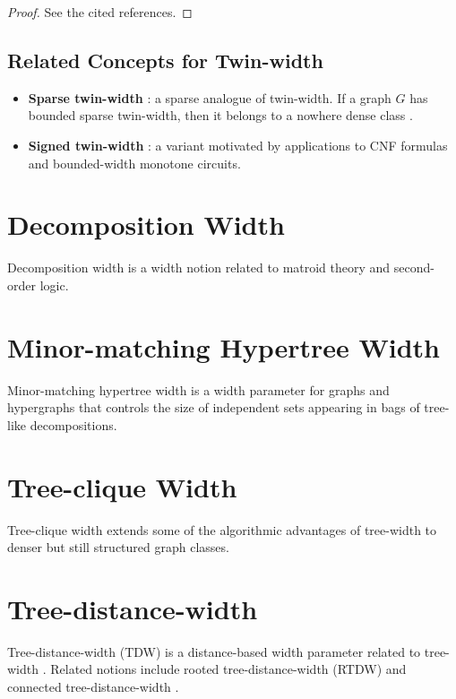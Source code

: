 \documentclass[10pt]{book}
\theoremstyle{definition}
\begin{document}
\begin{proof}
See the cited references.
\end{proof}

\subsection{Related Concepts for Twin-width}

\begin{itemize}
    \item \textbf{Sparse twin-width} \cite{171,252}: a sparse analogue of twin-width.  
    If a graph \(G\) has bounded sparse twin-width, then it belongs to a nowhere dense class \cite{314}.

    \item \textbf{Signed twin-width} \cite{203}: a variant motivated by applications to CNF formulas and bounded-width monotone circuits.
\end{itemize}

\section{Decomposition Width}

Decomposition width \cite{54} is a width notion related to matroid theory and second-order logic.

\section{Minor-matching Hypertree Width}

Minor-matching hypertree width \cite{55} is a width parameter for graphs and hypergraphs that controls the size of independent sets appearing in bags of tree-like decompositions.

\section{Tree-clique Width}

Tree-clique width \cite{56} extends some of the algorithmic advantages of tree-width to denser but still structured graph classes.

\section{Tree-distance-width}

Tree-distance-width (TDW) is a distance-based width parameter related to tree-width \cite{57}.  
Related notions include rooted tree-distance-width (RTDW) \cite{57} and connected tree-distance-width \cite{309,310}.
\end{document}
